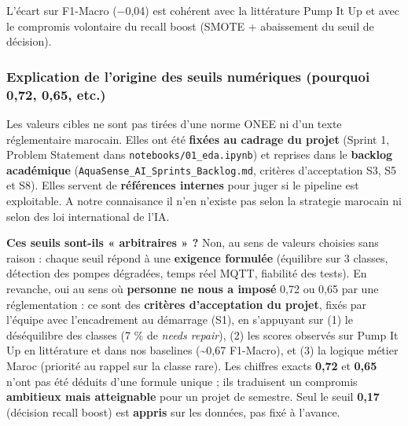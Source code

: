 \documentclass[11pt,a4paper]{report}
\begin{document}
L'écart sur F1-Macro (−0,04) est cohérent avec la littérature Pump It Up et avec le compromis volontaire du recall boost (SMOTE + abaissement du seuil de décision).



\subsubsection{Explication de l'origine des seuils numériques (pourquoi 0,72, 0,65, etc.)}



Les valeurs cibles ne sont pas tirées d'une norme ONEE ni d'un texte réglementaire marocain. Elles ont été \textbf{fixées au cadrage du projet} (Sprint 1, Problem Statement dans \texttt{notebooks/01\_eda.ipynb}) et reprises dans le \textbf{backlog académique} (\texttt{AquaSense\_AI\_Sprints\_Backlog.md}, critères d'acceptation S3, S5 et S8). Elles servent de \textbf{références internes} pour juger si le pipeline est exploitable. A notre connaisance il n'en n'existe pas selon la strategie marocain ni selon des loi international de l'IA.



\textbf{Ces seuils sont-ils « arbitraires » ?} Non, au sens de valeurs choisies sans raison : chaque seuil répond à une \textbf{exigence formulée} (équilibre sur 3 classes, détection des pompes dégradées, temps réel MQTT, fiabilité des tests). En revanche, oui au sens où \textbf{personne ne nous a imposé} 0,72 ou 0,65 par une réglementation : ce sont des \textbf{critères d'acceptation du projet}, fixés par l'équipe avec l'encadrement au démarrage (S1), en s'appuyant sur (1) le déséquilibre des classes (7 \% de \textit{needs repair}), (2) les scores observés sur Pump It Up en littérature et dans nos baselines (\textasciitilde{}0,67 F1-Macro), et (3) la logique métier Maroc (priorité au rappel sur la classe rare). Les chiffres exacts \textbf{0,72} et \textbf{0,65} n'ont pas été déduits d'une formule unique ; ils traduisent un compromis \textbf{ambitieux mais atteignable} pour un projet de semestre. Seul le seuil \textbf{0,17} (décision recall boost) est \textbf{appris} sur les données, pas fixé à l'avance.
\end{document}
